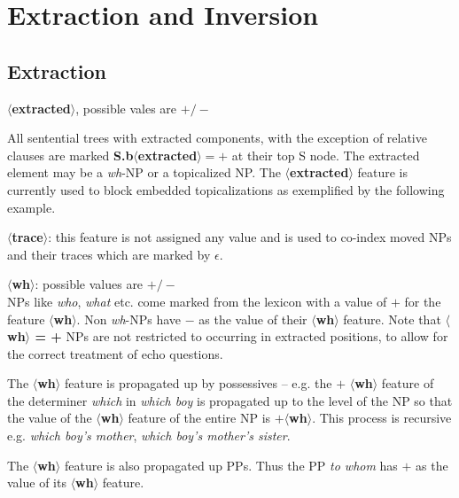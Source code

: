 \beginsentences
{}\label{ex:201} 
\endsentences

 
 
\section{Extraction and Inversion} 
 
\subsection{Extraction} 
{\bf $\langle$extracted$\rangle$}, possible vales are {\bf $+/-$} 
 
All sentential trees with extracted components, with the exception of 
relative clauses are marked {\bf S.b$\langle$extracted$\rangle = +$} 
at their top S node. The extracted element may be a {\em wh}-NP or a 
topicalized NP. The {\bf $\langle$extracted$\rangle$} feature 
is currently used to block embedded topicalizations as exemplified 
by the following example. 
\beginsentences
{}\label{ex:202} 
\endsentences

 
\noindent 
{\bf $\langle$trace$\rangle$}: this feature is not assigned any value and 
is used to co-index moved NPs and their traces which are marked by 
$\epsilon$. 
 
\noindent 
{\bf $\langle$wh$\rangle$}: possible values are {\bf $+/-$}\\ NPs like 
{\em who}, {\em what} etc. come marked from the lexicon with a value 
of {\bf $+$} for the feature {\bf $\langle$wh$\rangle$}.  Non {\em wh}-NPs have {\bf $-$} as the value of their {\bf $\langle$wh$\rangle$} feature. Note that {\bf $\langle$wh$\rangle$ = + } NPs are not restricted to occurring in extracted positions, to allow 
for the correct treatment of echo questions. 
 
The {\bf $\langle$wh$\rangle$} feature is propagated up by possessives 
-- e.g. the $+$ {\bf $\langle$wh$\rangle$} feature of the determiner 
{\em which} in {\em which boy} is propagated up to the level of the NP 
so that the value of the {\bf $\langle$wh$\rangle$} feature of the 
entire NP is $+${\bf $\langle$wh$\rangle$}. This process is recursive 
e.g. {\em which boy's mother}, {\em which boy's mother's sister}. 
 
The {\bf $\langle$wh$\rangle$} feature 
is also propagated up PPs. Thus the PP {\em to whom} has $+$ as the value of its 
{\bf $\langle$wh$\rangle$} feature. 
 
